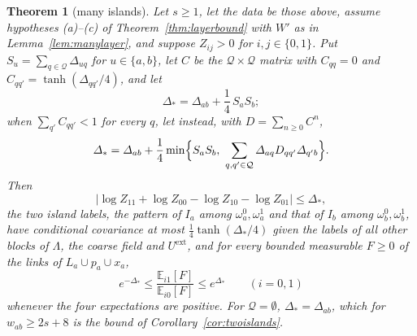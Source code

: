 \documentclass[11pt]{amsart}
\newtheorem{theorem}{Theorem}[section]
\theoremstyle{definition}
\theoremstyle{remark}
\numberwithin{equation}{section}
\newcommand{\E}{\mathbb{E}}
\begin{document}
\begin{theorem}[many islands]\label{thm:manyislands}
Let $s\ge1$, let the data be those above, assume hypotheses (a)--(c) of
Theorem~\ref{thm:layerbound} with $W'$ as in Lemma~\ref{lem:manylayer}, and
suppose $Z_{ij}>0$ for $i,j\in\{0,1\}$. Put $S_u=\sum_{q\in\mathcal Q}
\varDelta_{uq}$ for $u\in\{a,b\}$, let $C$ be the $\mathcal Q\times\mathcal Q$
matrix with $C_{qq}=0$ and $C_{qq'}=\tanh(\varDelta_{qq'}/4)$, and let
\[
\varDelta_*=\varDelta_{ab}+\frac14\,S_aS_b ;
\]
when $\sum_{q'}C_{qq'}<1$ for every $q$, let instead, with $D=\sum_{n\ge0}C^n$,
\[
\varDelta_*=\varDelta_{ab}+\frac14\min\Bigl\{S_aS_b,\ \sum_{q,q'\in
\mathcal Q}\varDelta_{aq}D_{qq'}\varDelta_{q'b}\Bigr\}.
\]
Then
\[
\bigl\lvert\log Z_{11}+\log Z_{00}-\log Z_{10}-\log Z_{01}\bigr\rvert\le
\varDelta_* ,
\]
the two island labels, the pattern of $I_a$ among $\omega_a^0,\omega_a^1$
and that of $I_b$ among $\omega_b^0,\omega_b^1$, have conditional covariance at most
$\frac14\tanh(\varDelta_*/4)$ given the labels of all other blocks of
$\Lambda$, the coarse field and $U^{\mathrm{ext}}$, and for every bounded
measurable $F\ge0$ of the links of $L_a\cup p_a\cup x_a$,
\[
e^{-\varDelta_*}\le\frac{\E_{i1}[F]}{\E_{i0}[F]}\le e^{\varDelta_*}
\qquad(i=0,1)
\]
whenever the four expectations are positive. For $\mathcal Q=\emptyset$,
$\varDelta_*=\varDelta_{ab}$, which for $w_{ab}\ge2s+8$ is the bound of
Corollary~\ref{cor:twoislands}.
\end{theorem}
\end{document}
